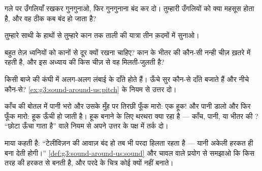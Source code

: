 \begin{exercise}[$\star$]\label{exo:g3:sound-around-us:6}
गले पर उँगलियाँ रखकर गुनगुनाओ, फिर गुनगुनाना बंद कर दो। तुम्हारी
उँगलियों को क्या महसूस होता है, और वह ठीक कब बंद हो जाता है?
\end{exercise}

\begin{exercise}[$\star$]\label{exo:g3:sound-around-us:7}
तुम्हारे साथी के हाथों से तुम्हारे कान तक ताली की यात्रा तीन क़दमों
में सुनाओ।
\end{exercise}

\begin{exercise}[$\star$]\label{exo:g3:sound-around-us:8}
बहुत तेज़ ध्वनियों को कानों से दूर क्यों रखना चाहिए? कान के भीतर की
कौन-सी नन्ही चीज़ ख़तरे में रहती है, और इस अध्याय की किस चीज़ से वह
मिलती-जुलती है?
\end{exercise}

\begin{exercise}[$\star$]\label{exo:g3:sound-around-us:9}
किसी बाजे की कंघी में अलग-अलग लंबाई के दाँते होते हैं। ऊँचे सुर
कौन-से दाँते बजाते हैं और नीचे कौन-से?
\cref{ex:g3:sound-around-us:pitch} के नियम से उत्तर दो।
\end{exercise}

\begin{exercise}[$\star\star$]\label{exo:g3:sound-around-us:10}
काँच की बोतल में पानी भरो और उसके मुँह पर तिरछी फूँक मारो: एक हूक!
और पानी डालो और फिर फूँक मारो: हूक ऊँची हो जाती है। हूक बनाने के लिए
थरथरा क्या रहा है --- काँच, पानी, या भीतर की ? ``छोटा ऊँचा गाता
है'' वाले नियम से अपने उत्तर के पक्ष में तर्क दो।
\end{exercise}

\begin{exercise}[$\star\star$]\label{exo:g3:sound-around-us:11}
माया कहती है: ``टेलीविज़न की आवाज़ बंद हो तब भी परदा हिलता रहता है
--- यानी अकेली हरकत ही  बना देती होगी।''
\cref{def:g3:sound-around-us:sound} और चावल वाले प्रयोग से समझाओ कि
 किस तरह की हरकत से बनती है, और परदे के चित्र कोई  क्यों
नहीं बनाते।
\end{exercise}
